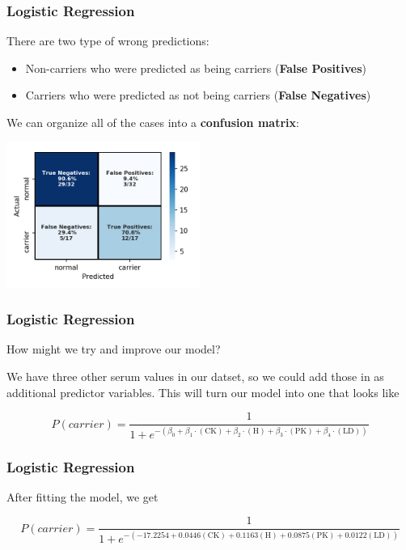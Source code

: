 \documentclass[11pt, table]{beamer}
\newcommand{\p}{\pause}
\begin{document}
\begin{frame}
\frametitle{Logistic Regression}
There are two type of wrong predictions:\p
\begin{itemize}
	\item Non-carriers who were predicted as being carriers (\textbf{False Positives})\p
	\item Carriers who were predicted as not being carriers (\textbf{False Negatives})\p
\end{itemize}
We can organize all of the cases into a \textbf{confusion matrix}:

\begin{center}
	\includegraphics[width=2.5in]{images/Dystrophy/cm.png}
\end{center}
\end{frame}

\begin{frame}
\frametitle{Logistic Regression}
How might we try and improve our model?
\vspace{0.1in}

We have three other serum values in our datset, so we could add those in as additional predictor variables. This will turn our model into one that looks like

$$P(carrier) = \frac{1}{1 + e^{-(\beta_0 + \beta_1\cdot(\text{CK}) + \beta_2\cdot(\text{H}) + \beta_3\cdot(\text{PK}) + \beta_4\cdot(\text{LD}))}}$$
\end{frame}

\begin{frame}
\frametitle{Logistic Regression}
After fitting the model, we get

$$P(carrier) = \frac{1}{1 + e^{-(-17.2254 + 0.0446(\text{CK}) + 0.1163(\text{H}) + 0.0875(\text{PK}) + 0.0122(\text{LD}))}}$$
\end{frame}
\end{document}
